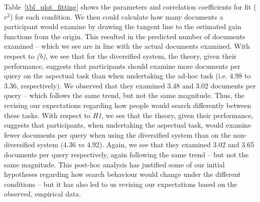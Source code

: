 Table~\ref{tbl_plot_fitting} shows the parameters and correlation coefficients for fit ($r^2$) for each condition. We then could calculate how many documents a participant would examine by drawing the tangent line to the estimated gain functions from the origin. This resulted in the predicted number of documents examined -- which we see are in line with the actual documents examined. With respect to \textit{(b)}, we see that for the diversified system, the theory, given their performance, suggests that participants should examine more documents per query on the aspectual task than when undertaking the ad-hoc task (i.e. 4.98 to 3.36, respectively). We observed that they examined 3.48 and 3.02 documents per query -- which follows the same trend, but not the same magnitude. Thus, the revising our expectations regarding how people would search differently between these tasks. With respect to \textit{H1}, we see that the theory, given their performance, suggests that participants, when undertaking the aspectual task, would examine fewer documents per query when using the diversified system than on the non-diversified system (4.36 vs 4.92). Again, we see that they examined 3.02 and 3.65 documents per query respectively, again following the same trend -- but not the same magnitude. This post-hoc analysis has justified some of our initial hypotheses regarding how search behaviour would change under the different conditions -- but it has also led to us revising our expectations based on the observed, empirical data.



